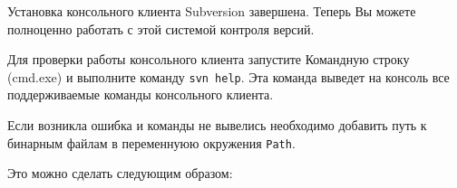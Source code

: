 \documentclass[a4paper,12pt]{article}
\begin{document}
Установка консольного клиента Subversion завершена. Теперь Вы можете
полноценно работать с этой системой контроля версий.

Для проверки работы консольного клиента запустите Командную строку
(cmd.exe) и выполните команду \texttt{svn help}. Эта команда выведет на
консоль все поддерживаемые команды консольного клиента. 

Если возникла ошибка и команды не вывелись необходимо добавить путь к бинарным
файлам в переменнуюю окружения \texttt{Path}.

Это можно сделать следующим образом:

\begin{figure}[h!]
	\begin{minipage}[h]{0.49\linewidth}
	\end{minipage}
	\hfill
	\begin{minipage}[h]{0.49\linewidth}
	\end{minipage}
\end{figure}
  
\end{document}
